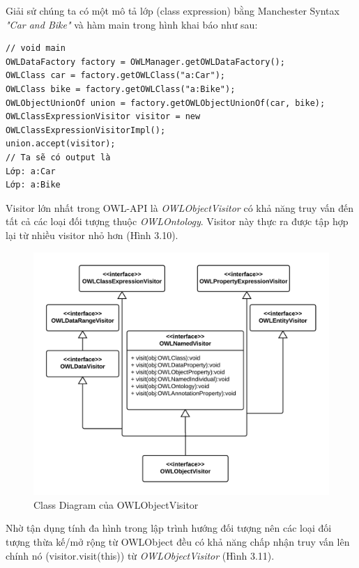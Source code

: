 {\let\thefootnote\relax{}
Giải sử chúng ta có một mô tả lớp (class expression) bằng Manchester Syntax \textit{"Car and Bike"} và hàm main trong hình khai báo như sau:
\begin{verbatim}
// void main 
OWLDataFactory factory = OWLManager.getOWLDataFactory();
OWLClass car = factory.getOWLClass("a:Car");
OWLClass bike = factory.getOWLClass("a:Bike");
OWLObjectUnionOf union = factory.getOWLObjectUnionOf(car, bike);
OWLClassExpressionVisitor visitor = new OWLClassExpressionVisitorImpl();
union.accept(visitor);
// Ta sẽ có output là 
Lớp: a:Car
Lớp: a:Bike                                       
\end{verbatim}
Visitor lớn nhất trong OWL-API là \textit{OWLObjectVisitor} có khả năng truy vấn đến tất cả các loại đối tượng thuộc \textit{OWLOntology}. Visitor này thực ra được tập hợp lại từ nhiều visitor nhỏ hơn (Hình 3.10).
\begin{figure}[h!]
	\centering
	\includegraphics[width=145mm]{Figures/uml_classdiagram_owlobjectvisitor_nobackground.png}
	\caption{Class Diagram của OWLObjectVisitor \label{overflow}}
\end{figure}
Nhờ tận dụng tính đa hình trong lập trình hướng đối tượng nên các loại đối tượng thừa kế/mở rộng từ OWLObject đều có khả năng chấp nhận truy vấn lên chính nó (visitor.visit(this)) từ \textit{OWLObjectVisitor} (Hình 3.11).
\begin{figure}[h!]

\end{figure}}
